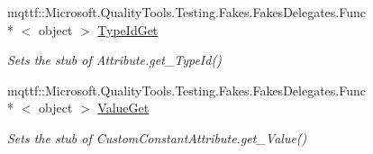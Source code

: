 \begin{DoxyCompactItemize}
mqttf\-::\-Microsoft.\-Quality\-Tools.\-Testing.\-Fakes.\-Fakes\-Delegates.\-Func\\*
$<$ object $>$ \hyperlink{class_system_1_1_runtime_1_1_compiler_services_1_1_fakes_1_1_stub_custom_constant_attribute_a3a27b7afdadfb2381bd3310bd6d4aa97}{Type\-Id\-Get}
\begin{DoxyCompactList}\small\item\em Sets the stub of Attribute.\-get\-\_\-\-Type\-Id()\end{DoxyCompactList}\item 
mqttf\-::\-Microsoft.\-Quality\-Tools.\-Testing.\-Fakes.\-Fakes\-Delegates.\-Func\\*
$<$ object $>$ \hyperlink{class_system_1_1_runtime_1_1_compiler_services_1_1_fakes_1_1_stub_custom_constant_attribute_aac03e538078f679d1e3add9317655200}{Value\-Get}
\begin{DoxyCompactList}\small\item\em Sets the stub of Custom\-Constant\-Attribute.\-get\-\_\-\-Value()\end{DoxyCompactList}\end{DoxyCompactItemize}
